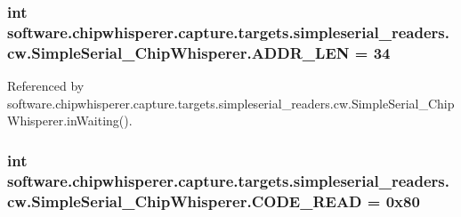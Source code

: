 \subsubsection[{A\+D\+D\+R\+\_\+\+L\+E\+N}]{\setlength{\rightskip}{0pt plus 5cm}int software.\+chipwhisperer.\+capture.\+targets.\+simpleserial\+\_\+readers.\+cw.\+Simple\+Serial\+\_\+\+Chip\+Whisperer.\+A\+D\+D\+R\+\_\+\+L\+E\+N = 34\hspace{0.3cm}{\ttfamily [static]}}\label{classsoftware_1_1chipwhisperer_1_1capture_1_1targets_1_1simpleserial__readers_1_1cw_1_1SimpleSerial__ChipWhisperer_a8ac640122bcbe84801161644ec447e8c}


Referenced by software.\+chipwhisperer.\+capture.\+targets.\+simpleserial\+\_\+readers.\+cw.\+Simple\+Serial\+\_\+\+Chip\+Whisperer.\+in\+Waiting().

\hypertarget{classsoftware_1_1chipwhisperer_1_1capture_1_1targets_1_1simpleserial__readers_1_1cw_1_1SimpleSerial__ChipWhisperer_a4c5517e6c34f42b975c6d04e9622eed2}{}
\subsubsection[{C\+O\+D\+E\+\_\+\+R\+E\+A\+D}]{\setlength{\rightskip}{0pt plus 5cm}int software.\+chipwhisperer.\+capture.\+targets.\+simpleserial\+\_\+readers.\+cw.\+Simple\+Serial\+\_\+\+Chip\+Whisperer.\+C\+O\+D\+E\+\_\+\+R\+E\+A\+D = 0x80\hspace{0.3cm}{\ttfamily [static]}}\label{classsoftware_1_1chipwhisperer_1_1capture_1_1targets_1_1simpleserial__readers_1_1cw_1_1SimpleSerial__ChipWhisperer_a4c5517e6c34f42b975c6d04e9622eed2}


